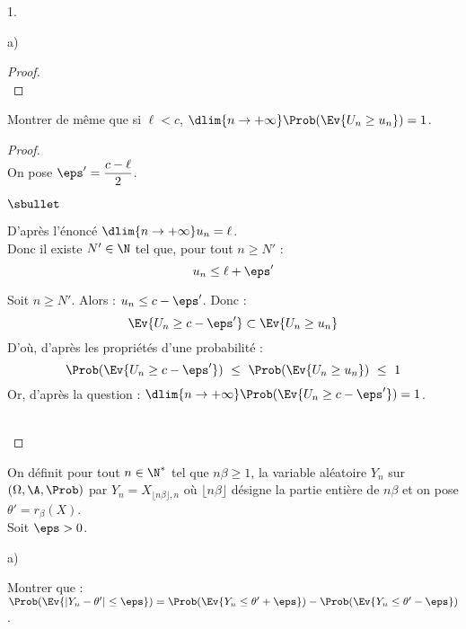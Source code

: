 \documentclass[11pt]{article}%
\begin{document}
\begin{noliste}{1.}
\begin{noliste}{a)}
\begin{proof}
      ~\\[-1.4cm]
    \end{proof}
    
    

    
    \item Montrer de même que si $\ell <c$, $\dlim{n 
    \to +\infty} \Prob(\Ev{U_n \geq u_n})=1$. 
    
    \begin{proof}~\\[.1cm]
    On pose $\eps'=\dfrac{c-\ell}{2}$.
      \begin{noliste}{$\sbullet$}
	\item D'après l'énoncé $\dlim{n\to+\infty}
	u_n = \ell$.\\
	Donc il existe $N'\in \N$ tel que, pour tout $n \geq N'$ :
	\[
	  u_n \leq \ell + \eps'
	\]
	
	\item Soit $n\geq N'$. Alors : $u_n \leq c -\eps'$.
	Donc :
	\[
	  \Ev{U_n \geq c-\eps'} \subset \Ev{U_n \geq u_n}
	\]
	D'où, d'après les propriétés d'une probabilité :
	\[
	  \Prob(\Ev{U_n \geq c-\eps'}) \ \leq \ 
	  \Prob(\Ev{U_n \geq u_n}) \ \leq \ 1
	\]
	Or, d'après la question  : 
	$\dlim{n\to +\infty} \Prob(\Ev{U_n \geq c-\eps'}) =1$.
      \end{noliste}
      
      ~\\[-1.4cm]
    \end{proof}
  \end{noliste}

  \item On définit pour tout $n \in \N^*$ tel que $n \beta \geq 1$, 
  la variable aléatoire $Y_n$ sur $(\Omega,\A,\Prob)$ par 
  $Y_n=X_{\lfloor n\beta \rfloor, n}$ où $\lfloor n\beta \rfloor$ 
  désigne la partie entière de $n\beta$ et on pose 
  $\theta'=r_{\beta}(X)$.\\
  Soit $\eps >0$.
  \begin{noliste}{a)}
    \setlength{\itemsep}{2mm}
    \item Montrer que : $\Prob(\Ev{|Y_n-\theta'| \leq
    \eps})=\Prob(\Ev{Y_n \leq \theta'+\eps}) - \Prob(\Ev{Y_n \leq
    \theta'-\eps})$. 
    

\end{noliste}
\end{noliste}
\end{document}
